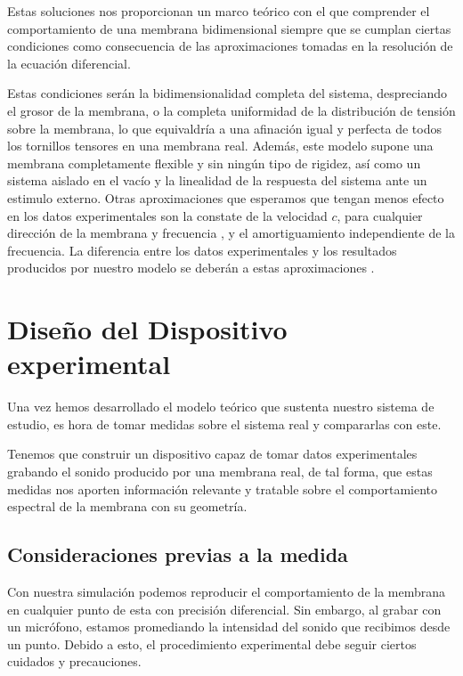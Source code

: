 \documentclass[journal, a4paper,onecolumn]{IEEEtran}
\begin{document}
Estas soluciones nos proporcionan un marco teórico con el que comprender el comportamiento de una membrana bidimensional siempre que se cumplan ciertas condiciones como consecuencia de las aproximaciones tomadas en la resolución de la ecuación diferencial. \newline

Estas condiciones serán la bidimensionalidad completa del sistema, despreciando el grosor de la membrana, o la completa uniformidad de la distribución de tensión sobre la membrana, lo que equivaldría a una afinación igual y perfecta de todos los tornillos tensores en una membrana real. Además, este modelo supone una membrana completamente flexible y sin ningún tipo de rigidez, así como un sistema aislado en el vacío y la linealidad de la respuesta del sistema ante un estimulo externo. Otras aproximaciones que esperamos que tengan menos efecto en los datos experimentales son la constate de la velocidad $c$, para cualquier dirección de la membrana y frecuencia , y el amortiguamiento independiente de la frecuencia. La diferencia entre los datos experimentales y los resultados producidos por nuestro modelo se deberán a estas aproximaciones  \cite{fisicamusical}.

\section{Diseño del Dispositivo experimental}
Una vez hemos desarrollado el modelo teórico que sustenta nuestro sistema de estudio, es hora de tomar medidas sobre el sistema real y compararlas con este.\newline

Tenemos que construir un dispositivo capaz de tomar datos experimentales grabando el sonido producido por una membrana real, de tal forma, que estas medidas nos aporten información relevante y tratable sobre el comportamiento espectral de la membrana con su geometría.

\subsection{Consideraciones previas a la medida}
Con nuestra simulación podemos reproducir el comportamiento de la membrana en cualquier punto de esta con precisión diferencial. Sin embargo, al grabar con un micrófono, estamos promediando la intensidad del sonido que recibimos desde un punto. Debido a esto, el procedimiento experimental debe seguir ciertos cuidados y precauciones. \newline
\end{document}
